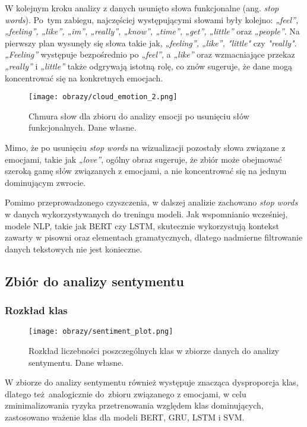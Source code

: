 \newpage
W kolejnym kroku analizy z danych usunięto słowa funkcjonalne (ang. \textit{stop words}). Po~tym zabiegu, najczęściej występującymi słowami były kolejno: \textit{„feel”, „feeling”, „like”, „im”, „really”, „know”, „time”, „get”, „little”} oraz \textit{„people”}. Na pierwszy plan wysunęły się słowa takie jak, \textit{„feeling”, „like”, "little"} czy \textit{"really"}. \textit{„Feeling”} występuje bezpośrednio po \textit{„feel”}, a \textit{„like”} oraz wzmacniające przekaz \textit{„really”} i \textit{„little”} także odgrywają istotną rolę, co znów sugeruje, że dane mogą koncentrować się na konkretnych emocjach.

\begin{figure}[H]
    \centering
    \texttt{[image: obrazy/cloud\_emotion\_2.png]}
    \caption{Chmura słow dla zbioru do analizy emocji po usunięciu słów funkcjonalnych. Dane własne.}
    \label{fig:cloud-emotion-2-png}
\end{figure}
Mimo, że po usunięciu \textit{stop words} na wizualizacji pozostały słowa związane z emocjami, takie jak  \textit{„love”}, ogólny obraz sugeruje, że zbiór może obejmować szeroką gamę słów związanych z emocjami, a nie koncentrować się na jednym dominującym zwrocie.

Pomimo przeprowadzonego czyszczenia, w dalszej analizie zachowano  \textit{stop words} w danych wykorzystywanych do treningu modeli. Jak wspomnianio wcześniej, modele NLP, takie jak BERT czy LSTM, skutecznie wykorzystują kontekst zawarty w pisowni oraz elementach gramatycznych, dlatego nadmierne filtrowanie danych tekstowych nie jest konieczne.

\subsection{Zbiór do analizy sentymentu}
\subsubsection{Rozkład klas}
\begin{figure}[H]
    \centering
    \texttt{[image: obrazy/sentiment\_plot.png]}
    \caption{Rozkład liczebności poszczególnych klas w zbiorze danych do analizy sentymentu. Dane własne.}
    \label{fig:sentiment-class-png}
\end{figure}

W zbiorze do analizy sentymentu również występuje znacząca dysproporcja klas, dlatego też~analogicznie do~zbioru związanego z emocjami, w celu zminimalizowania ryzyka przetrenowania względem klas dominujących, zastosowano ważenie klas dla modeli BERT, GRU, LSTM i SVM.

